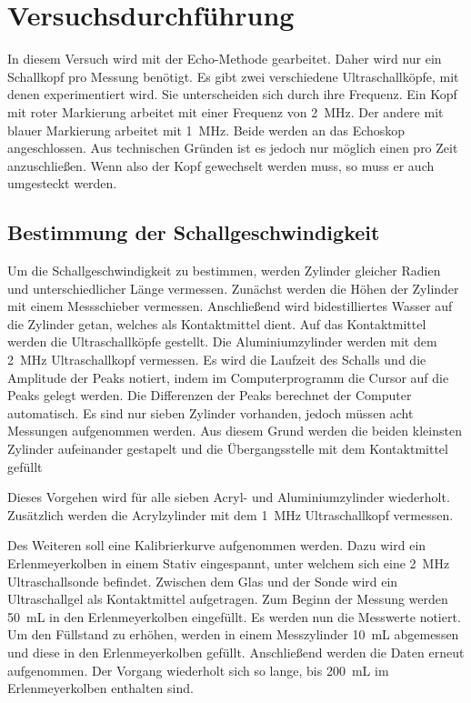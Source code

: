 


\section{Versuchsdurchführung}

In diesem Versuch wird mit der Echo-Methode gearbeitet. Daher wird nur ein Schallkopf pro Messung benötigt.
Es gibt zwei verschiedene Ultraschallköpfe, mit denen experimentiert wird. Sie unterscheiden sich durch 
ihre Frequenz. Ein Kopf mit roter Markierung arbeitet mit einer Frequenz von \qty{2}{\mega \hertz}. Der 
andere mit blauer Markierung arbeitet mit \qty{1}{\mega \hertz}. Beide werden an das Echoskop angeschlossen.
Aus technischen Gründen ist es jedoch nur möglich einen pro Zeit anzuschließen. Wenn also der Kopf gewechselt 
werden muss, so muss er auch umgesteckt werden.

\subsection{Bestimmung der Schallgeschwindigkeit}

\noindent Um die Schallgeschwindigkeit zu bestimmen, werden Zylinder gleicher Radien und unterschiedlicher 
Länge vermessen. Zunächst werden die Höhen der Zylinder mit einem Messschieber vermessen.
Anschließend wird bidestilliertes Wasser auf die Zylinder getan, welches als Kontaktmittel dient. 
Auf das Kontaktmittel werden die Ultraschallköpfe gestellt. 
Die Aluminiumzylinder werden mit dem \qty{2}{\mega \hertz} Ultraschallkopf vermessen. Es wird die Laufzeit 
des Schalls und die Amplitude der Peaks notiert, indem im Computerprogramm die Cursor auf die Peaks gelegt werden.
Die Differenzen der Peaks berechnet der Computer automatisch.   
Es sind nur sieben Zylinder vorhanden, jedoch müssen acht Messungen aufgenommen werden. Aus diesem Grund werden 
die beiden kleinsten Zylinder aufeinander gestapelt und die Übergangsstelle mit dem Kontaktmittel gefüllt

\noindent Dieses Vorgehen wird für alle sieben Acryl- und Aluminiumzylinder wiederholt. Zusätzlich werden die Acrylzylinder 
mit dem \qty{1}{\mega \hertz} Ultraschallkopf vermessen.

\noindent Des Weiteren soll eine Kalibrierkurve aufgenommen werden. Dazu wird ein Erlenmeyerkolben in einem Stativ eingespannt,
unter welchem sich eine \qty{2}{\mega \hertz} Ultraschallsonde befindet. Zwischen dem Glas und der Sonde wird ein 
Ultraschallgel als Kontaktmittel aufgetragen. Zum Beginn der Messung werden \qty{50}{\milli \liter} in den 
Erlenmeyerkolben eingefüllt. Es werden nun die Messwerte notiert. Um den Füllstand zu erhöhen, werden in einem 
Messzylinder \qty{10}{\milli \liter} abgemessen und diese in den Erlenmeyerkolben gefüllt. Anschließend werden die 
Daten erneut aufgenommen. Der Vorgang wiederholt sich so lange, bis \qty{200}{\milli \liter} im Erlenmeyerkolben 
enthalten sind. 


